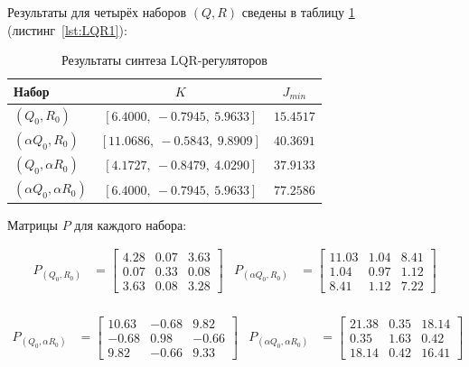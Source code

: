 \documentclass[a4paper,12pt]{article}
\begin{document}
	
	
	
	Результаты для четырёх наборов $(Q,R)$ сведены в таблицу \ref{tab:lqr_results} (листинг~\ref{lst:LQR1}):
	
	\begin{table}[H]
		\centering
		\caption{Результаты синтеза LQR-регуляторов}
		\label{tab:lqr_results}
		\renewcommand{\arraystretch}{1.3}
		\begin{tabular}{@{}lcc@{}}
			\toprule
			\textbf{Набор} & \textbf{\(K\)} & \textbf{\(J_{min}\)} \\
			\midrule
			\((Q_0, R_0)\) & \([6.4000, \ -0.7945, \ 5.9633]\) & \(15.4517\) \\
			\((\alpha Q_0, R_0)\) & \([11.0686, \ -0.5843, \ 9.8909]\) & \(40.3691\) \\
			\((Q_0, \alpha R_0)\) & \([4.1727, \ -0.8479, \ 4.0290]\) & \(37.9133\) \\
			\((\alpha Q_0, \alpha R_0)\) & \([6.4000, \ -0.7945, \ 5.9633]\) & \(77.2586\) \\
			\bottomrule
		\end{tabular}
	\end{table}
	
Матрицы $P$ для каждого набора:

\[
\begin{aligned}
	P_{(Q_0,R_0)} &= 
	\begin{bmatrix}
		4.28 & 0.07 & 3.63 \\
		0.07 & 0.33 & 0.08 \\
		3.63 & 0.08 & 3.28
	\end{bmatrix} &
	P_{(\alpha Q_0,R_0)} &= 
	\begin{bmatrix}
		11.03 & 1.04 & 8.41 \\
		1.04 & 0.97 & 1.12 \\
		8.41 & 1.12 & 7.22
	\end{bmatrix} \\[1.2cm]
\end{aligned}
\]

\[\begin{aligned}
	P_{(Q_0,\alpha R_0)} &= \begin{bmatrix}
		10.63 & -0.68 & 9.82 \\
		-0.68 & 0.98 & -0.66 \\
		9.82 & -0.66 & 9.33
	\end{bmatrix} &
	P_{(\alpha Q_0,\alpha R_0)} &= 
	\begin{bmatrix}
		21.38 & 0.35 & 18.14 \\
		0.35 & 1.63 & 0.42 \\
		18.14 & 0.42 & 16.41
	\end{bmatrix}
\end{aligned}
\]
	
\end{document}
